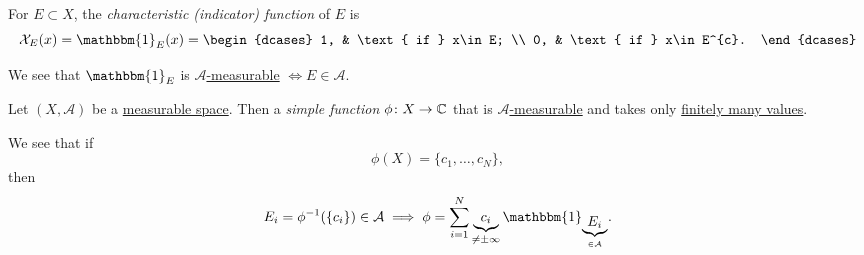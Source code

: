 \begin{definition}\label{def:characteristic-function}
	For \(E\subset X\), the \emph{characteristic (indicator) function} of \(E\) is
	\[
		\mathcal{X} _E (x)= \mathbbm{1}_{E}(x) = \begin{dcases}
			1, & \text{ if }  x\in E;     \\
			0, & \text{ if }  x\in E^{c}.
		\end{dcases}
	\]
\end{definition}
\begin{remark}
	We see that \(\mathbbm{1}_{ E}\) is \hyperref[def:A-measurable-function]{\(\mathcal{A}\)-measurable} \(\iff E\in\mathcal{A}\).
\end{remark}

\begin{definition}\label{def:simple-function}
	Let \((X, \mathcal{A} )\) be a \hyperref[def:measurable-space]{measurable space}. Then a \emph{simple function} \(\phi \colon X\to \mathbb{\MakeUppercase{c}} \) that
	is \hyperref[def:A-measurable-function]{\(\mathcal{A} \)-measurable} and takes only \underline{finitely many values}.
\end{definition}
\begin{remark}
	We see that if
	\[
		\phi (X) = \{c_1, \ldots , c_N \},
	\]
	then
	\[
		E_{i}= \phi ^{-1} (\{c_{i}\})\in \mathcal{A} \implies \phi = \sum\limits_{i=1}^{N} \underbrace{c_{i}}_{\neq \pm \infty }\mathbbm{1}_{\underbrace{E_{i}}_{\in \mathcal{A}}}.
	\]
\end{remark}